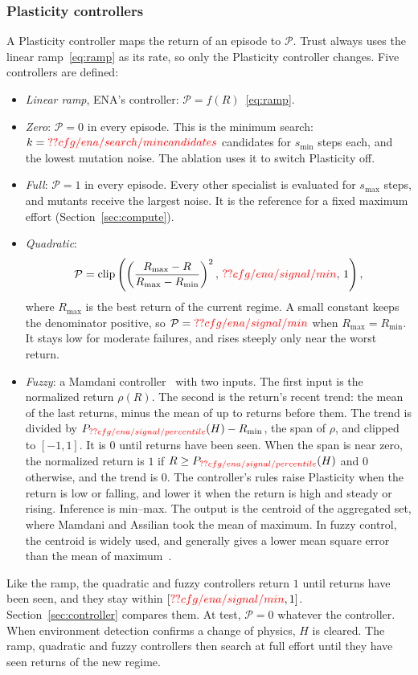 \subsubsection{Plasticity controllers}
\label{sec:controllers}
A Plasticity controller maps the return of an episode to $\mathcal{P}$. Trust always uses the linear ramp~\eqref{eq:ramp} as its rate, so only the Plasticity controller changes. Five controllers are defined:
\begin{itemize}
\item \textit{Linear ramp}, ENA's controller: $\mathcal{P} = f(R)$~\eqref{eq:ramp}.
\item \textit{Zero}: $\mathcal{P} = 0$ in every episode. This is the minimum search: $k=\Res{cfg/ena/search/mincandidates}$ candidates for $s_{\min}$ steps each, and the lowest mutation noise. The ablation uses it to switch Plasticity off.
\item \textit{Full}: $\mathcal{P} = 1$ in every episode. Every other specialist is evaluated for $s_{\max}$ steps, and mutants receive the largest noise. It is the reference for a fixed maximum effort (Section~\ref{sec:compute}).
\item \textit{Quadratic}:
\[
\mathcal{P} = \mathrm{clip}\left(\left(\frac{R_{\max} - R}{R_{\max} - R_{\min}}\right)^{2},\, \Res{cfg/ena/signal/min},\, 1\right),
\]
where $R_{\max}$ is the best return of the current regime. A small constant keeps the denominator positive, so $\mathcal{P} = \Res{cfg/ena/signal/min}$ when $R_{\max} = R_{\min}$. It stays low for moderate failures, and rises steeply only near the worst return.
\item \textit{Fuzzy}: a Mamdani controller~\citep{mamdani1975experiment} with two inputs. The first input is the normalized return $\rho(R)$. The second is the return's recent trend: the mean of the last  returns, minus the mean of up to  returns before them. The trend is divided by $P_{\Res{cfg/ena/signal/percentile}}(H) - R_{\min}$, the span of $\rho$, and clipped to $[-1, 1]$. It is $0$ until  returns have been seen. When the span is near zero, the normalized return is $1$ if $R \ge P_{\Res{cfg/ena/signal/percentile}}(H)$ and $0$ otherwise, and the trend is $0$. The controller's  rules raise Plasticity when the return is low or falling, and lower it when the return is high and steady or rising. Inference is min--max. The output is the centroid of the aggregated set, where Mamdani and Assilian took the mean of maximum. In fuzzy control, the centroid is widely used, and generally gives a lower mean square error than the mean of maximum~\citep{lee1990fuzzy}.
\end{itemize}
Like the ramp, the quadratic and fuzzy controllers return $1$ until  returns have been seen, and they stay within $[\Res{cfg/ena/signal/min}, 1]$. Section~\ref{sec:controller} compares them. At test, $\mathcal{P}=0$ whatever the controller. When environment detection confirms a change of physics, $H$ is cleared. The ramp, quadratic and fuzzy controllers then search at full effort until they have seen  returns of the new regime.

